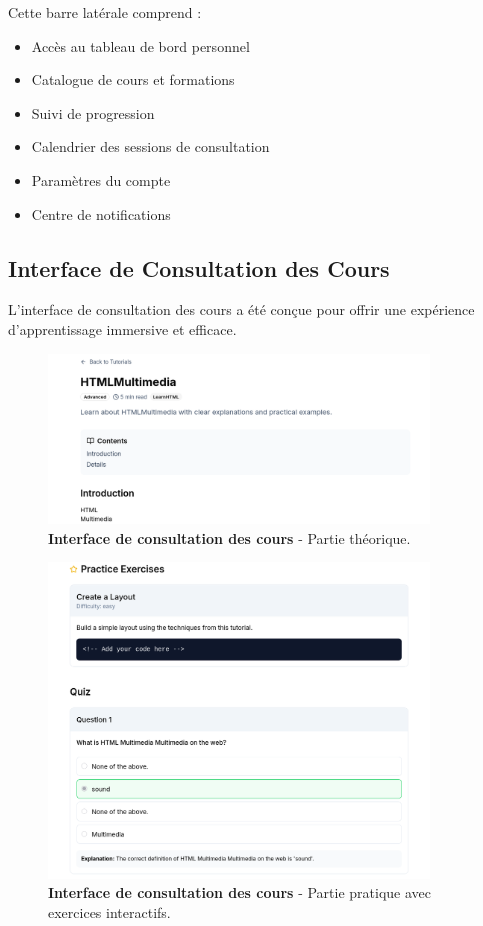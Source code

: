 Cette barre latérale comprend :
\begin{itemize}
  \item Accès au tableau de bord personnel
  \item Catalogue de cours et formations
  \item Suivi de progression
  \item Calendrier des sessions de consultation
  \item Paramètres du compte
  \item Centre de notifications
\end{itemize}

\subsection{Interface de Consultation des Cours}

L'interface de consultation des cours a été conçue pour offrir une expérience d'apprentissage immersive et efficace.

\begin{figure}[h!]
  \centering
  \includegraphics[width=0.9\textwidth,keepaspectratio]{week_3_img/part1.png}
  \caption{\textbf{Interface de consultation des cours} - Partie théorique.}
  \label{fig:course_view_part1}
\end{figure}

\begin{figure}[h!]
  \centering
  \includegraphics[width=0.9\textwidth,keepaspectratio]{week_3_img/part2.png}
  \caption{\textbf{Interface de consultation des cours} - Partie pratique avec exercices interactifs.}
  \label{fig:course_view_part2}
\end{figure}

